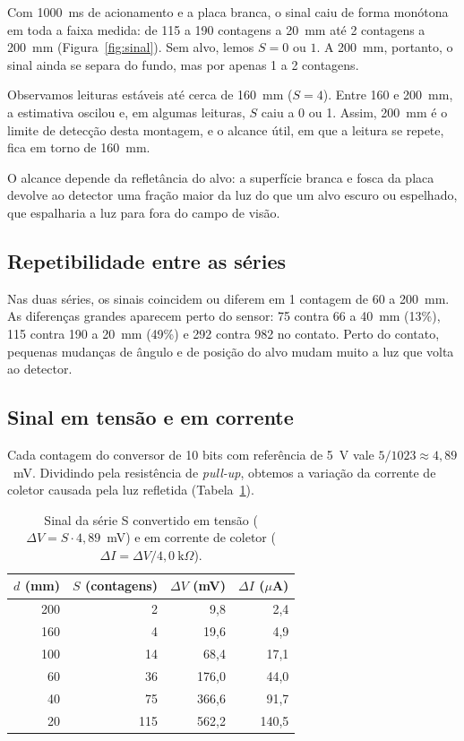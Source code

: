 \documentclass[11pt,a4paper]{article}
\begin{document}
Com 1000~ms de acionamento e a placa branca, o sinal caiu de forma monótona em toda a faixa medida: de 115 a 190 contagens a 20~mm até 2 contagens a 200~mm (Figura~\ref{fig:sinal}). Sem alvo, lemos $S = 0$ ou $1$. A 200~mm, portanto, o sinal ainda se separa do fundo, mas por apenas 1 a 2 contagens.

Observamos leituras estáveis até cerca de 160~mm ($S = 4$). Entre 160 e 200~mm, a estimativa oscilou e, em algumas leituras, $S$ caiu a 0 ou 1. Assim, 200~mm é o limite de detecção desta montagem, e o alcance útil, em que a leitura se repete, fica em torno de 160~mm.

O alcance depende da refletância do alvo: a superfície branca e fosca da placa devolve ao detector uma fração maior da luz do que um alvo escuro ou espelhado, que espalharia a luz para fora do campo de visão.

\subsection{Repetibilidade entre as séries}

Nas duas séries, os sinais coincidem ou diferem em 1 contagem de 60 a 200~mm. As diferenças grandes aparecem perto do sensor: 75 contra 66 a 40~mm (13\%), 115 contra 190 a 20~mm (49\%) e 292 contra 982 no contato. Perto do contato, pequenas mudanças de ângulo e de posição do alvo mudam muito a luz que volta ao detector.

\subsection{Sinal em tensão e em corrente}

Cada contagem do conversor de 10 bits com referência de 5~V vale $5/1023 \approx 4{,}89$~mV. Dividindo pela resistência de \emph{pull-up}, obtemos a variação da corrente de coletor causada pela luz refletida (Tabela~\ref{tab:sensibilidade}).

\begin{table}[!htb]
\centering
\small
\caption{Sinal da série S convertido em tensão ($\Delta V = S \cdot 4{,}89$~mV) e em corrente de coletor ($\Delta I = \Delta V / 4{,}0~\mathrm{k}\Omega$).}
\label{tab:sensibilidade}
\begin{tabular}{rrrr}
\toprule
$d$ (mm) & $S$ (contagens) & $\Delta V$ (mV) & $\Delta I$ ($\mu$A) \\
\midrule
200 & 2   & 9,8   & 2,4 \\
160 & 4   & 19,6  & 4,9 \\
100 & 14  & 68,4  & 17,1 \\
60  & 36  & 176,0 & 44,0 \\
40  & 75  & 366,6 & 91,7 \\
20  & 115 & 562,2 & 140,5 \\
\bottomrule
\end{tabular}
\end{table}
\end{document}

